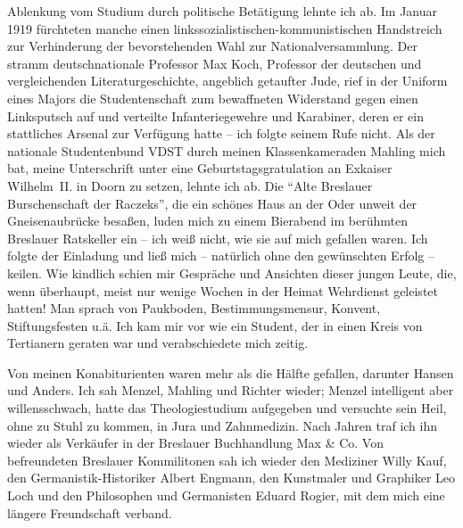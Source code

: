 Ablenkung vom Studium durch politische Betätigung lehnte ich ab. Im Januar 1919 fürchteten manche einen linkssozialistischen-kommunistischen Handstreich zur Verhinderung der bevorstehenden Wahl zur Nationalversammlung. Der stramm deutschnationale Professor Max Koch, Professor der deutschen und vergleichenden Literaturgeschichte, angeblich getaufter Jude, rief in der Uniform eines Majors die Studentenschaft zum bewaffneten Widerstand gegen einen Linksputsch auf und verteilte Infanteriegewehre und Karabiner, deren er ein stattliches Arsenal zur Verfügung hatte -- ich folgte seinem Rufe nicht. Als der nationale Studentenbund VDST durch meinen Klassenkameraden Mahling mich bat, meine Unterschrift unter eine Geburtstagsgratulation an Exkaiser Wilhelm~II. in Doorn zu setzen, lehnte ich ab. Die \enquote{Alte Breslauer Burschenschaft der Raczeks}, die ein schönes Haus an der Oder unweit der Gneisenaubrücke besaßen, luden mich zu einem Bierabend im berühmten Breslauer Ratskeller ein -- ich weiß nicht, wie sie auf mich gefallen waren. Ich folgte der Einladung und ließ mich -- natürlich ohne den gewünschten Erfolg -- keilen. Wie kindlich schien mir Gespräche und Ansichten dieser jungen Leute, die, wenn überhaupt, meist nur wenige Wochen in der Heimat Wehrdienst geleistet hatten! Man sprach von Paukboden, Bestimmungsmensur, Konvent, Stiftungsfesten u.ä. Ich kam mir vor wie ein Student, der in einen Kreis von Tertianern geraten war und verabschiedete mich zeitig.

Von meinen Konabiturienten waren mehr als die Hälfte gefallen, darunter Hansen und Anders. Ich sah Menzel, Mahling und Richter wieder; Menzel intelligent aber willensschwach, hatte das Theologiestudium aufgegeben und versuchte sein Heil, ohne zu Stuhl zu kommen, in Jura und Zahnmedizin. Nach Jahren traf ich ihn wieder als Verkäufer in der Breslauer Buchhandlung Max \& Co. Von befreundeten Breslauer Kommilitonen sah ich wieder den Mediziner Willy Kauf, den Germanistik-Historiker Albert Engmann, den Kunstmaler und Graphiker Leo Loch und den Philosophen und Germanisten Eduard Rogier, mit dem mich eine längere Freundschaft verband.

